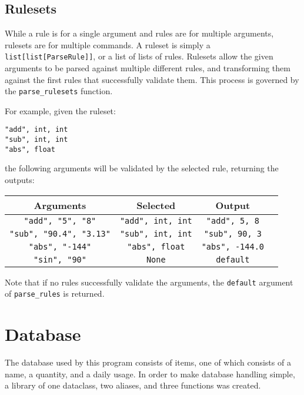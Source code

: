 \documentclass{article}
\begin{document}
		\subsection{Rulesets}
			While a rule is for a single argument and rules are for multiple arguments, rulesets
			are for multiple commands. A ruleset is simply a \verb|list[list[ParseRule]]|, or a
			list of lists of rules. Rulesets allow the given arguments to be parsed against
			multiple different rules, and transforming them against the first rules that
			successfully validate them. This process is governed by the \verb|parse_rulesets|
			function.

			For example, given the ruleset:

			\begin{center}
				\verb|"add", int, int| \\
				\verb|"sub", int, int| \\
				\verb|"abs", float|    \\
			\end{center}

			the following arguments will be validated by the selected rule, returning the outputs:

			\begin{center}
				\begin{tabular}{|c|c|c|c|}
					\hline
					Arguments & Selected & Output
					\\ \hline
						\verb|"add", "5", "8"| &
						\verb|"add", int, int| &
						\verb|"add", 5, 8|
					\\ \hline
						\verb|"sub", "90.4", "3.13"| &
						\verb|"sub", int, int| &
						\verb|"sub", 90, 3|
					\\ \hline
						\verb|"abs", "-144"| &
						\verb|"abs", float| &
						\verb|"abs", -144.0|
					\\ \hline
						\verb|"sin", "90"| &
						\verb|None| &
						\verb|default|
					\\ \hline
				\end{tabular}
			\end{center}

			Note that if no rules successfully validate the arguments, the \verb|default| argument of
			\verb|parse_rules| is returned.

		\pagebreak



	\section{Database}
		The database used by this program consists of items, one of which consists of a name,
		a quantity, and a daily usage. In order to make database handling simple, a library of one
		dataclass, two aliases, and three functions was created.
\end{document}
